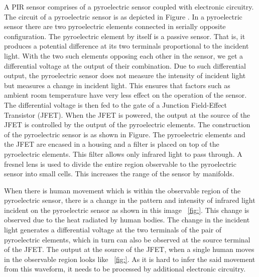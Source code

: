 A PIR sensor comprises of a pyroelectric sensor coupled with electronic circuitry. The circuit of a pyroelectric sensor is as depicted in Figure . In a pyroelectric sensor there are two pyroelectric elements connected in serially opposite configuration. The pyroelectric element by itself is a passive sensor. That is, it produces a potential difference at its two terminals proportional to the incident light. With the two such elements opposing each other in the sensor, we get a differential voltage at the output of their combination. Due to such differential output, the pyroelectric sensor does not measure the intensity of incident light but measures a change in incident light. This ensures that factors such as ambient room temperature have very less effect on the operation of the sensor. The differential voltage is then fed to the gate of a Junction Field-Effect Transistor (JFET). When the JFET is powered, the output at the source of the JFET is controlled by the output of the pyroelectric elements. The construction of the pyroelectric sensor is as shown in Figure. The pyroelectric elements and the JFET are encased in a housing and a filter is placed on top of the pyroelectric elements. This filter allows only infrared light to pass through. A fresnel lens is used to divide the entire region observable to the pyroelectric sensor into small cells. This increases the range of the sensor by manifolds.



When there is human movement which is within the observable region of the pyroelectric sensor, there is a change in the pattern and intensity of infrared light incident on the pyroelectric sensor as shown in this image ~\ref{fig:}. This change is observed due to the heat radiated by human bodies. The change in the incident light generates a differential voltage at the two terminals of the pair of pyroelectric elements, which in turn can also be observed at the source terminal of the JFET. The output at the source of the JFET, when a single human moves in the observable region looks like ~\ref{fig:}. As it is hard to infer the said movement from this waveform, it needs to be processed by additional electronic circuitry. 

